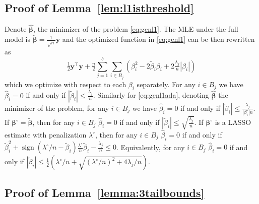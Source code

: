 \documentclass[aos]{imsart}
\theoremstyle{plain}
\newcommand{\bs}{\boldsymbol}
\begin{document}
\subsection{Proof of Lemma~\ref{lem:l1isthreshold}}
    Denote $\hat{\bs \beta}$, the minimizer of the problem \eqref{eq:genl1}. The MLE under the full model is $\tilde{\bs\beta}=\tfrac{1}{\sqrt{n}} \bs y$ and the optimized function in \eqref{eq:genl1} can be then rewritten as
	$$
	\tfrac{1}{2}\bs y^{\top}\bs y +\tfrac{n}{2}\sum_{j=1}^b\sum_{i\in B_j}\left(\beta_i^2-2\tilde\beta_i\beta_i+2\tfrac{\lambda_j}{n}|\beta_i|\right)
	$$
	which we optimize with respect to each $\beta_i$ separately. For any $i\in B_j$ we have $\hat\beta_i=0$ if and only if $|\tilde \beta_i|\leq \frac{\lambda_j}{n}$. Similarly  for \eqref{eq:genl1ada}, denoting $\hat{\bs \beta}$ the minimizer of the problem, for any $i\in B_j$ we have $\hat\beta_i=0$ if and only if $|\tilde \beta_i|\leq \frac{\lambda_j}{|\beta^{\circ}_i|n}$. If $\bs \beta^{\circ}= \tilde{\bs\beta}$, then for any $i\in B_j$ $\hat{\beta}_i = 0$ if and only if $|\tilde \beta_i|\leq \sqrt{\tfrac{\lambda_j}{n}}$. If $\bs\beta^\circ$ is a LASSO estimate with penalization $\lambda^\circ$, then for any $i\in B_j$ 
 $\hat{\beta}_i = 0$ if and only if $\tilde{\beta}^2_i + \operatorname{sign}(\lambda^{\circ}/n-\tilde{\beta}_i) \frac{\lambda^\circ}{n}\tilde{\beta}_i-\frac{\lambda_j}{n} \leq 0$. Equivalently, for any $i\in B_j$ 
 $\hat{\beta}_i = 0$ if and only if $|\tilde{\beta}_ i| \leq  \frac{1}{2}\left(\lambda^\circ/n+\sqrt{(\lambda^\circ/n)^2+4 \lambda_j/n}\right)$.

\subsection{Proof of Lemma~\ref{lemma:3tailbounds}}
\end{document}
